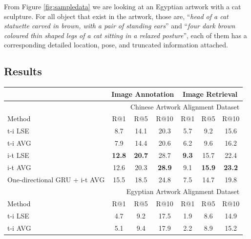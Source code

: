 From Figure \ref{fig:sampledata} we are looking at an Egyptian artwork with a cat sculpture. For all object that exist in the artwork, those are, ``\textit{head of a cat statuette carved in brown, with a pair of standing ears}'' and ``\textit{four dark brown coloured thin shaped legs of a cat sitting in a relaxed posture}'', each of them has a corresponding detailed location, pose, and truncated information attached. 

\subsection{Results}


\begin{table}[h!]
\centering
\begin{tabular}{lcccccc}
\hline
\hline
\multicolumn{1}{c}{} & \multicolumn{3}{c}{Image Annotation} & \multicolumn{3}{c}{Image Retrieval} \\ \hline\hline
\multicolumn{7}{r}{Chinese Artwork Alignment Dataset}                                              \\ \hline
Method               & R@1         & R@5         & R@10       & R@1        & R@5        & R@10      \\ \hline
t-i LSE              & 8.7        & 14.1        & 20.3       & 5.7       & 9.2       & 15.6      \\ \hline
t-i AVG              & 7.9        & 14.4        & 20.6       & 6.2       & 9.6       & 16.2      \\ \hline
i-t LSE              & \textbf{12.8}        & \textbf{20.7}        & 28.7       & \textbf{9.3}       & 15.7       & 22.4      \\ \hline
i-t AVG              & 12.6        & 20.3        & \textbf{28.9}       & 9.1       & \textbf{15.9}       & \textbf{23.2}      \\ \hline
One-directional GRU + i-t AVG  & 15.5        & 18.5        & 24.8       & 7.5       & 14.7       & 19.8      \\ \hline\hline
\multicolumn{7}{r}{Egyptian Artwork Alignment Dataset}                                               \\ \hline
Method               & R@1         & R@5         & R@10       & R@1        & R@5        & R@10      \\ \hline
t-i LSE              & 4.7         & 9.2        & 17.5       & 1.9        & 8.6       & 14.9      \\ \hline
t-i AVG              & 5.1         & 9.4        & 17.9       & 2.2        & 8.9       & 15.2      \\ \hline

\end{tabular}
\end{table}
